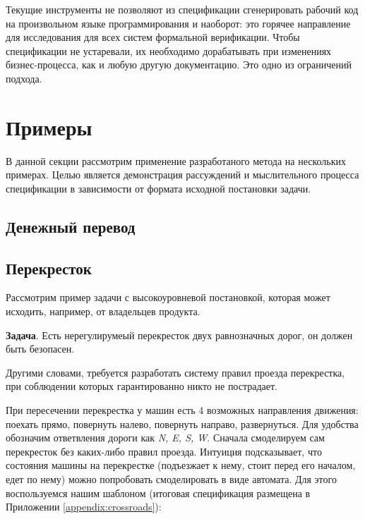 \documentclass[14pt, openany]{book}
\newcounter{appendix}
\begin{document}
Текущие инструменты не позволяют из спецификации сгенерировать рабочий код на произвольном языке программирования и наоборот: это горячее направление для исследования для всех систем формальной верификации. Чтобы спецификации не устаревали, их необходимо дорабатывать при изменениях бизнес-процесса, как и любую другую документацию. Это одно из ограничений подхода.

\section{Примеры}
В данной секции рассмотрим применение разработаного метода на нескольких примерах.
Целью является демонстрация рассуждений и мыслительного процесса спецификации в зависимости от формата исходной постановки задачи.

\subsection{Денежный перевод}

\subsection{Перекресток}
Рассмотрим пример задачи с высокоуровневой постановкой, которая может исходить, например, от владельцев продукта.

\textbf{Задача}. Есть нерегулирумеый перекресток двух равнозначных дорог, он должен быть безопасен.

Другими словами, требуется разработать систему правил проезда перекрестка, при соблюдении которых гарантированно никто не пострадает.

При пересечении перекрестка у машин есть 4 возможных направления движения: поехать прямо, повернуть налево, повернуть направо, развернуться. Для удобства обозначим ответвления дороги как \emph{N, E, S, W}. Сначала смоделируем сам перекресток без каких-либо правил проезда. Интуиция подсказывает, что состояния машины на перекрестке (подъезжает к нему, стоит перед его началом, едет по нему) можно попробовать смоделировать в виде автомата. Для этого воспользуемся нашим шаблоном (итоговая спецификация размещена в Приложении \ref{appendix:crossroads}):
\end{document}
